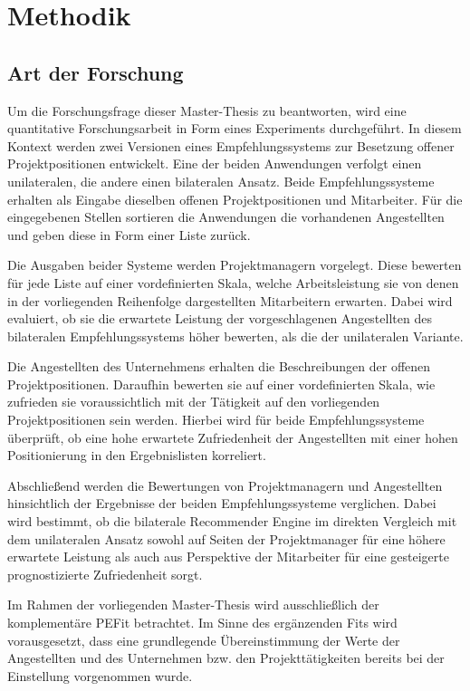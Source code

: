 \chapter{Methodik}
\label{ch:methodik}

\section{Art der Forschung}
\label{ch:methodik:art}
Um die Forschungsfrage dieser Master-Thesis zu beantworten, wird eine quantitative Forschungsarbeit in Form eines Experiments durchgeführt. In diesem Kontext werden zwei Versionen eines Empfehlungssystems zur Besetzung offener Projektpositionen entwickelt. Eine der beiden Anwendungen verfolgt einen unilateralen, die andere einen bilateralen Ansatz. Beide Empfehlungssysteme erhalten als Eingabe dieselben offenen Projektpositionen und Mitarbeiter. Für die eingegebenen Stellen sortieren die Anwendungen die vorhandenen Angestellten und geben diese in Form einer Liste zurück.

Die Ausgaben beider Systeme werden Projektmanagern vorgelegt. Diese bewerten für jede Liste auf einer vordefinierten Skala, welche Arbeitsleistung sie von denen in der vorliegenden Reihenfolge dargestellten Mitarbeitern erwarten. Dabei wird evaluiert, ob sie die erwartete Leistung der vorgeschlagenen Angestellten des bilateralen Empfehlungssystems höher bewerten, als die der unilateralen Variante.

Die Angestellten des Unternehmens erhalten die Beschreibungen der offenen Projektpositionen. Daraufhin bewerten sie auf einer vordefinierten Skala, wie zufrieden sie voraussichtlich mit der Tätigkeit auf den vorliegenden Projektpositionen sein werden. Hierbei wird für beide Empfehlungssysteme überprüft, ob eine hohe erwartete Zufriedenheit der Angestellten mit einer hohen Positionierung in den Ergebnislisten korreliert.

Abschließend werden die Bewertungen von Projektmanagern und Angestellten hinsichtlich der Ergebnisse der beiden Empfehlungssysteme verglichen. Dabei wird bestimmt, ob die bilaterale Recommender Engine im direkten Vergleich mit dem unilateralen Ansatz sowohl auf Seiten der Projektmanager für eine höhere erwartete Leistung als auch aus Perspektive der Mitarbeiter für eine gesteigerte prognostizierte Zufriedenheit sorgt.

Im Rahmen der vorliegenden Master-Thesis wird ausschließlich der komplementäre \ac{PEFit} betrachtet. Im Sinne des ergänzenden Fits wird vorausgesetzt, dass eine grundlegende Übereinstimmung der Werte der Angestellten und des Unternehmen bzw. den Projekttätigkeiten bereits bei der Einstellung vorgenommen wurde.

